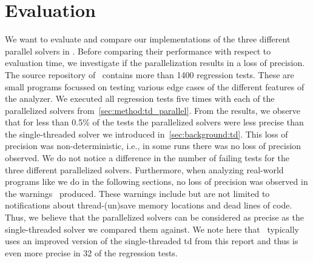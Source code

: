 \section{Evaluation}
\label{sec:eval}
We want to evaluate and compare our implementations of the three different parallel solvers in \gob. Before comparing their performance with respect to evaluation time, we investigate if the parallelization results in a loss of precision.
The source repository of \gob\ contains more than 1400 regression tests. These are small programs focussed on testing various edge cases of the different features of the analyzer. We executed all regression tests five times with each of the parallelized solvers from~\autoref{sec:method:td_parallel}. From the results, we observe that for less than 0.5\% of the tests the parallelized solvers were less precise than the single-threaded solver we introduced in~\autoref{sec:background:td}. This loss of precision was non-deterministic, i.e., in some runs there was no loss of precision observed. We do not notice a difference in the number of failing tests for the three different parallelized solvers. Furthermore, when analyzing real-world programs like we do in the following sections, no loss of precision was observed in the warnings \gob\ produced. These warnings include but are not limited to notifications about thread-(un)save memory locations and dead lines of code. Thus, we believe that the parallelized solvers can be considered as precise as the single-threaded solver we compared them against. We note here that \gob\ typically uses an improved version of the single-threaded \ac{td} from this report and thus is even more precise in 32 of the regression tests.

